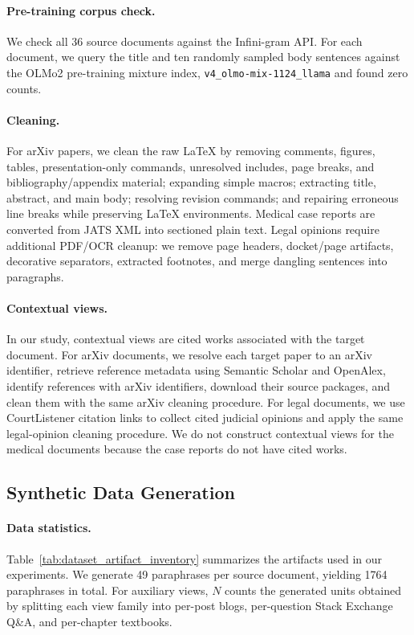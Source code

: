 \paragraph{Pre-training corpus check.} We check all 36 source documents against the Infini-gram API.  For each document, we query the title and ten randomly sampled body sentences against the OLMo2 pre-training mixture index, \texttt{v4\_olmo-mix-1124\_llama} and found zero counts.

\paragraph{Cleaning.}
For arXiv papers, we clean the raw LaTeX by removing comments, figures, tables, presentation-only commands, unresolved includes, page breaks, and bibliography/appendix material; expanding simple macros; extracting title, abstract, and main body; resolving revision commands; and repairing erroneous line breaks while preserving LaTeX environments.  Medical case reports are converted from JATS XML into sectioned plain text.  Legal opinions require additional PDF/OCR cleanup: we remove page headers, docket/page artifacts, decorative separators, extracted footnotes, and merge dangling sentences into paragraphs.

\paragraph{Contextual views.}
In our study, contextual views are cited works associated with the target document.  For arXiv documents, we resolve each target paper to an arXiv identifier, retrieve reference metadata using Semantic Scholar and OpenAlex, identify references with arXiv identifiers, download their source packages, and clean them with the same arXiv cleaning procedure.  For legal documents, we use CourtListener citation links to collect cited judicial opinions and apply the same legal-opinion cleaning procedure.  We do not construct contextual views for the medical documents because the case reports do not have cited works.

\subsection{Synthetic Data Generation}

\paragraph{Data statistics.}
Table~\ref{tab:dataset_artifact_inventory} summarizes the artifacts used in our experiments.  We generate 49 paraphrases per source document, yielding 1764 paraphrases in total.  For auxiliary views, $N$ counts the generated units obtained by splitting each view family into per-post blogs, per-question Stack Exchange Q\&A, and per-chapter textbooks. 

